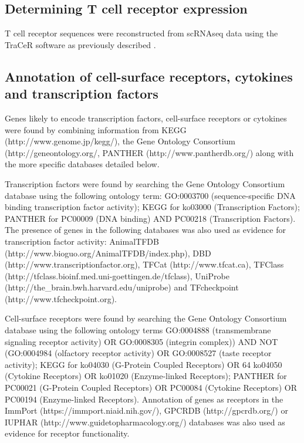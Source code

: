 \subsection{Determining T cell receptor expression}

T cell receptor sequences were reconstructed from scRNAseq data using the TraCeR software as
previously described \cite{Stubbington2016-dt}.

\subsection{Annotation of cell-surface receptors, cytokines and transcription factors}

\begin{sloppypar}
Genes likely to encode transcription factors, cell-surface receptors or cytokines were found by combining information from KEGG (http://www.genome.jp/kegg/), the Gene Ontology Consortium (http://geneontology.org/, PANTHER (http://www.pantherdb.org/) along with the more specific databases detailed below.
\end{sloppypar}

\begin{sloppypar}
Transcription factors were found by searching the Gene Ontology Consortium database using the following ontology term: GO:0003700 (sequence-specific DNA binding transcription factor activity); KEGG for ko03000 (Transcription Factors); PANTHER for PC00009 (DNA binding) AND PC00218 (Transcription Factors). The presence of genes in the following databases was also used as evidence for transcription factor activity: AnimalTFDB (http://www.bioguo.org/AnimalTFDB/index.php), DBD (http://www.transcriptionfactor.org), TFCat (http://www.tfcat.ca), TFClass (http://tfclass.bioinf.med.uni-goettingen.de/tfclass), UniProbe (http://the\_brain.bwh.harvard.edu/uniprobe) and TFcheckpoint (http://www.tfcheckpoint.org).
\end{sloppypar}

Cell-surface receptors were found by searching the Gene Ontology Consortium database using the following ontology terms GO:0004888 (transmembrane signaling receptor activity) OR GO:0008305 (integrin complex)) AND NOT (GO:0004984 (olfactory receptor activity) OR GO:0008527 (taste receptor activity); KEGG for ko04030 (G-Protein Coupled Receptors) OR 64 ko04050 (Cytokine Receptors) OR ko01020 (Enzyme-linked Receptors); PANTHER for PC00021 (G-Protein Coupled Receptors) OR PC00084 (Cytokine Receptors) OR PC00194 (Enzyme-linked Receptors). Annotation of genes as receptors in the ImmPort (https://immport.niaid.nih.gov/), GPCRDB (http://gpcrdb.org/) or IUPHAR (http://www.guidetopharmacology.org/) databases was also used as evidence for receptor functionality.

